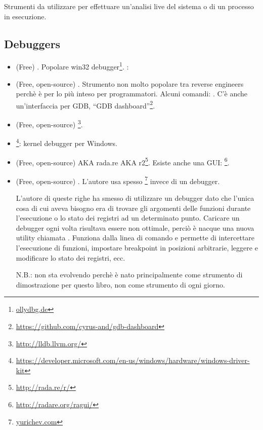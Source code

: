 
Strumenti da utilizzare per effettuare un'analisi live del sistema o di un processo in esecuzione.

\subsection{Debuggers}

\myindex{\olly}

\begin{itemize}
\item (Free) .
Popolare win32 debugger\footnote{\href{http://go.yurichev.com/17032}{ollydbg.de}}.
\ShortHotKeyCheatsheet: 

\item (Free, open-source) .
Strumento non molto popolare tra reverse engineers perchè è per lo più inteso per programmatori.
Alcuni comandi: .
C'è anche un'interfaccia per GDB, ``GDB dashboard''\footnote{\url{https://github.com/cyrus-and/gdb-dashboard}}.

\item (Free, open-source) \footnote{\url{http://lldb.llvm.org/}}.

\item {}\footnote{\url{https://developer.microsoft.com/en-us/windows/hardware/windows-driver-kit}}:
kernel debugger per Windows.

\item (Free, open-source)  \ac{AKA} rada.re \ac{AKA} r2\footnote{\url{http://rada.re/r/}}.
Esiste anche una GUI: \footnote{\url{http://radare.org/ragui/}}.

\item (Free, open-source) .
\label{tracer}
L'autore usa spesso 
\footnote{\href{http://go.yurichev.com/17338}{yurichev.com}}
invece di un debugger.

L'autore di queste righe ha smesso di utilizzare un debugger dato che l'unica cosa di cui aveva bisogno era di trovare gli
argomenti delle funzioni durante l'esecuzione o lo stato dei registri ad un determinato punto.
Caricare un debugger ogni volta risultava essere non ottimale, perciò è nacque una nuova utility chiamata .
Funziona dalla linea di comando e permette di intercettare l'esecuzione di funzioni,
impostare breakpoint in posizioni arbitrarie, leggere e modificare lo stato dei registri, ecc.

N.B.:  non sta evolvendo perchè è nato principalmente come strumento di dimostrazione per questo libro, non come strumento di ogni giorno.
\end{itemize}

